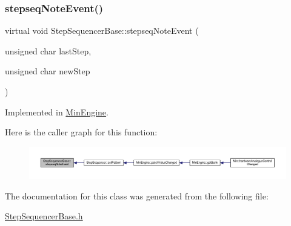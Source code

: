 \subsubsection{\texorpdfstring{stepseq\+Note\+Event()}{stepseqNoteEvent()}}
{\footnotesize\ttfamily virtual void Step\+Sequencer\+Base\+::stepseq\+Note\+Event (\begin{DoxyParamCaption}\item[{unsigned char}]{last\+Step,  }\item[{unsigned char}]{new\+Step }\end{DoxyParamCaption})\hspace{0.3cm}{\ttfamily [pure virtual]}}



Implemented in \hyperlink{class_min_engine_a46ab2a887b8c83c9b484304778bc01a1}{Min\+Engine}.

Here is the caller graph for this function\+:
\nopagebreak
\begin{figure}[H]
\begin{center}
\leavevmode
\includegraphics[width=350pt]{class_step_sequencer_base_a9f32f8ae8eb8afb1c2ea39ed8d856657_icgraph}
\end{center}
\end{figure}


The documentation for this class was generated from the following file\+:\begin{DoxyCompactItemize}
\item 
\hyperlink{_step_sequencer_base_8h}{Step\+Sequencer\+Base.\+h}\end{DoxyCompactItemize}
